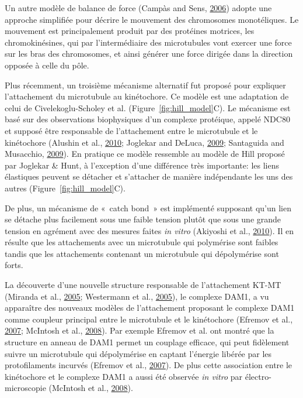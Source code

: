 \documentclass[12pt,a4paper,twoside,openright]{book}
\begin{document}
Un autre modèle de balance de force (Campàs and Sens,
\protect\hyperlink{ref-Campas2006}{2006}) adopte une approche simplifiée
pour décrire le mouvement des chromosomes monotéliques. Le mouvement est
principalement produit par des protéines motrices, les chromokinésines,
qui par l'intermédiaire des microtubules vont exercer une force sur les
bras des chromosomes, et ainsi générer une force dirigée dans la
direction opposée à celle du pôle.

Plus récemment, un troisième mécanisme alternatif fut proposé pour
expliquer l'attachement du microtubule au kinétochore. Ce modèle est une
adaptation de celui de Civelekoglu-Scholey et al.
(Figure~\ref{fig:hill_model}C). Le mécanisme est basé sur des
observations biophysiques d'un complexe protéique, appelé NDC80 et
supposé être responsable de l'attachement entre le microtubule et le
kinétochore (Alushin et al., \protect\hyperlink{ref-Alushin2010}{2010};
Joglekar and DeLuca, \protect\hyperlink{ref-Joglekar2009}{2009};
Santaguida and Musacchio,
\protect\hyperlink{ref-Santaguida2009a}{2009}). En pratique ce modèle
ressemble au modèle de Hill proposé par Joglekar \& Hunt, à l'exception
d'une différence très importante: les liens élastiques peuvent se
détacher et s'attacher de manière indépendante les uns des autres
(Figure~\ref{fig:hill_model}C).

De plus, un mécanisme de «~catch bond~» est implémenté supposant qu'un
lien se détache plus facilement sous une faible tension plutôt que sous
une grande tension en agrément avec des mesures faites \emph{in vitro}
(Akiyoshi et al., \protect\hyperlink{ref-Akiyoshi2010a}{2010}). Il en
résulte que les attachements avec un microtubule qui polymérise sont
faibles tandis que les attachements contenant un microtubule qui
dépolymérise sont forts.

La découverte d'une nouvelle structure responsable de l'attachement
KT-MT (Miranda et al., \protect\hyperlink{ref-Miranda2005}{2005};
Westermann et al., \protect\hyperlink{ref-Westermann2005}{2005}), le
complexe DAM1, a vu apparaître des nouveaux modèles de l'attachement
proposant le complexe DAM1 comme coupleur principal entre le microtubule
et le kinétochore (Efremov et al.,
\protect\hyperlink{ref-Efremov2007}{2007}; McIntosh et al.,
\protect\hyperlink{ref-McIntosh2008}{2008}). Par exemple Efremov et al.
ont montré que la structure en anneau de DAM1 permet un couplage
efficace, qui peut fidèlement suivre un microtubule qui dépolymérise en
captant l'énergie libérée par les protofilaments incurvés (Efremov et
al., \protect\hyperlink{ref-Efremov2007}{2007}). De plus cette
association entre le kinétochore et le complexe DAM1 a aussi été
observée \emph{in vitro} par électro-microscopie (McIntosh et al.,
\protect\hyperlink{ref-McIntosh2008}{2008}).
\end{document}
